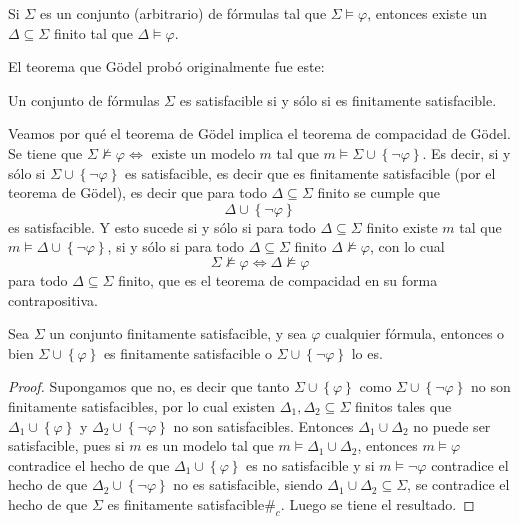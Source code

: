 \documentclass[12pt]{report}
\newcounter{it}
\theoremstyle{largebreak}
\begin{document}
    \begin{theor}
        Si $\Sigma$ es un conjunto (arbitrario) de fórmulas tal que $\Sigma\vDash\varphi$, entonces existe un $\Delta\subseteq\Sigma$ finito tal que $\Delta\vDash\varphi$.
    \end{theor}

    El teorema que Gödel probó originalmente fue este:

    \begin{theor}
        Un conjunto de fórmulas $\Sigma$ es satisfacible si y sólo si es finitamente satisfacible.
    \end{theor}

    Veamos por qué el teorema de Gödel implica el teorema de compacidad de Gödel. Se tiene que $\Sigma\nvDash\varphi\iff$ existe un modelo $m$ tal que $m\vDash\Sigma\cup\left\{\neg\varphi \right\}$. Es decir, si y sólo si $\Sigma\cup\left\{\neg\varphi \right\}$ es satisfacible, es decir que es finitamente satisfacible (por el teorema de Gödel), es decir que para todo $\Delta\subseteq\Sigma$ finito se cumple que
    \begin{equation*}
        \Delta\cup\left\{\neg\varphi \right\}
    \end{equation*}
    es satisfacible. Y esto sucede si y sólo si para todo $\Delta\subseteq\Sigma$ finito existe $m$ tal que $m\vDash\Delta\cup\left\{\neg\varphi \right\}$, si y sólo si para todo $\Delta\subseteq\Sigma$ finito $\Delta\nvDash\varphi$, con lo cual
    \begin{equation*}
        \Sigma\nvDash\varphi\iff\Delta\nvDash\varphi
    \end{equation*}
    para todo $\Delta\subseteq\Sigma$ finito, que es el teorema de compacidad en su forma contrapositiva.

    \begin{lema}
        Sea $\Sigma$ un conjunto finitamente satisfacible, y sea $\varphi$ cualquier fórmula, entonces o bien $\Sigma\cup\left\{\varphi\right\}$ es finitamente satisfacible o $\Sigma\cup\left\{\neg\varphi\right\}$ lo es.
    \end{lema}

    \begin{proof}
        Supongamos que no, es decir que tanto $\Sigma\cup\left\{\varphi\right\}$ como $\Sigma\cup\left\{\neg\varphi\right\}$ no son finitamente satisfacibles, por lo cual existen $\Delta_1,\Delta_2\subseteq\Sigma$ finitos tales que $\Delta_1\cup\left\{\varphi \right\}$ y $\Delta_2\cup\left\{\neg\varphi \right\}$ no son satisfacibles.
        Entonces $\Delta_1\cup\Delta_2$ no puede ser satisfacible, pues si $m$ es un modelo tal que $m\vDash\Delta_1\cup\Delta_2$, entonces $m\vDash\varphi$ contradice el hecho de que $\Delta_1\cup\left\{\varphi \right\}$ es no satisfacible y si $m\vDash\neg\varphi$ contradice el hecho de que $\Delta_2\cup\left\{\neg\varphi \right\}$ no es satisfacible, siendo $\Delta_1\cup\Delta_2\subseteq\Sigma$, se contradice el hecho de que $\Sigma$ es finitamente satisfacible$\#_c$. Luego se tiene el resultado.
    \end{proof}
\end{document}

